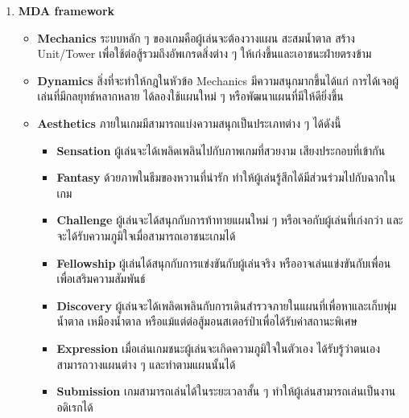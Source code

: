 \documentclass[12pt,oneside,openright,a4paper]{cpe-thai-project}
\begin{document}
\begin{enumerate}
  \item \textbf{MDA framework}
  \begin{itemize}
    \item \textbf{Mechanics} ระบบหลัก ๆ ของเกมคือผู้เล่นจะต้องวางแผน 
    สะสมน้ำตาล สร้าง Unit/Tower เพื่อใช้ต่อสู้รวมถึงอัพเกรดสิ่งต่าง ๆ ให้เก่งขึ้นและเอาชนะฝ่ายตรงข้าม
    \item \textbf{Dynamics} สิ่งที่จะทำให้กฎในหัวข้อ Mechanics 
    มีความสนุกมากขึ้นได้แก่ การได้เจอผู้เล่นที่มีกลยุทธ์หลากหลาย ได้ลองใช้แผนใหม่ ๆ หรือพัฒนาแผนที่มีให้ดียิ่งขึ้น
    \item \textbf{Aesthetics} ภายในเกมมีสามารถแบ่งความสนุกเป็นประเภทต่าง ๆ ได้ดังนี้
    \begin{itemize}
      \item \textbf{Sensation} ผู้เล่นจะได้เพลิดเพลินไปกับภาพเกมที่สวยงาม เสียงประกอบที่เข้ากัน
      \item \textbf{Fantasy} ด้วยภาพในธีมของหวานที่น่ารัก ทำให้ผู้เล่นรู้สึกได้มีส่วนร่วมไปกับฉากในเกม
      \item \textbf{Challenge} ผู้เล่นจะได้สนุกกับการท้าทายแผนใหม่ ๆ หรือเจอกับผู้เล่นที่เก่งกว่า 
      และจะได้รับความภูมิใจเมื่อสามารถเอาชนะเกมได้
      \item \textbf{Fellowship} ผู้เล่นได้สนุกกับการแข่งขันกับผู้เล่นจริง 
      หรืออาจเล่นแข่งขันกับเพื่อนเพื่อเสริมความสัมพันธ์
      \item \textbf{Discovery} ผู้เล่นจะได้เพลิดเพลินกับการเดินสำรวจภายในแผนที่เพื่อหาและเก็บพุ่มน้ำตาล 
      เหมืองน้ำตาล หรือแม้แต่ต่อสู้มอนสเตอร์ป่าเพื่อได้รับค่าสถานะพิเศษ
      \item \textbf{Expression} เมื่อเล่นเกมชนะผู้เล่นจะเกิดความภูมิใจในตัวเอง 
      ได้รับรู้ว่าตนเองสามารถวางแผนต่าง ๆ และทำตามแผนนั้นได้
      \item \textbf{Submission} เกมสามารถเล่นได้ในระยะเวลาสั้น ๆ ทำให้ผู้เล่นสามารถเล่นเป็นงานอดิเรกได้	
    \end{itemize} 
  \end{itemize}
\end{enumerate}
\end{document}

